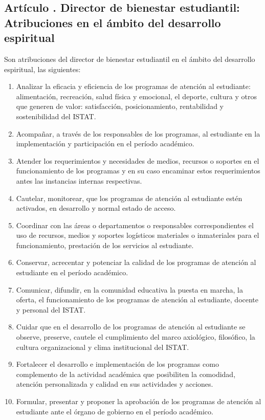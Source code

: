 \subsection{Artículo . Director de bienestar estudiantil: Atribuciones en el ámbito del desarrollo espiritual}
\addtocounter{ns}{1}
Son atribuciones del director de bienestar estudiantil en el ámbito del desarrollo espiritual, las siguientes: 
\begin{enumerate}
\item Analizar la eficacia y eficiencia de los programas de atención al estudiante: alimentación, recreación, salud física y emocional, el deporte, cultura y otros que generen de valor: satisfacción, posicionamiento, rentabilidad y sostenibilidad del ISTAT. 
\item Acompañar, a través de los responsables de los programas, al estudiante en la implementación y participación en el período académico. 
\item Atender los requerimientos y necesidades de medios, recursos o soportes en el funcionamiento de los programas y en su caso encaminar estos requerimientos antes las instancias internas respectivas. 
\item Cautelar, monitorear, que los programas de atención al estudiante estén activados, en desarrollo y normal estado de acceso.  
\item Coordinar con las áreas o departamentos o responsables correspondientes el uso de recursos, medios y soportes logísticos materiales o inmateriales para el funcionamiento, prestación de los servicios al estudiante. 
\item Conservar, acrecentar y potenciar la calidad de los programas de atención al estudiante en el período académico. 
\item Comunicar, difundir, en la comunidad educativa la puesta en marcha, la oferta, el funcionamiento de los programas de atención al estudiante, docente y personal del ISTAT. 
\item Cuidar que en el desarrollo de los programas de atención al estudiante se observe, preserve, cautele el cumplimiento del marco axiológico, filosófico, la cultura organizacional y clima institucional del ISTAT. 
\item Fortalecer el desarrollo e implementación de los programas como complemento de la actividad académica que posibiliten la comodidad, atención personalizada y calidad en sus actividades y acciones.  
\item Formular, presentar y proponer la aprobación de los programas de atención al estudiante ante el órgano de gobierno en el período académico. 

\end{enumerate}
